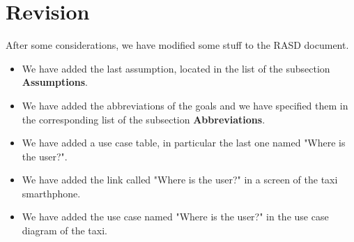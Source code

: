 \section{Revision}
After some considerations, we have modified some stuff to the RASD document.
\begin{itemize}
    \item We have added the last assumption, located in the list of the subsection \textbf{Assumptions}.
    \item We have added the abbreviations of the goals and we have specified them in the corresponding list of the subsection \textbf{Abbreviations}.
    \item We have added a use case table, in particular the last one named "Where is the user?".
    \item We have added the link called "Where is the user?" in a screen of the taxi smarthphone.
    \item We have added the use case named "Where is the user?" in the use case diagram of the taxi.
\end{itemize}